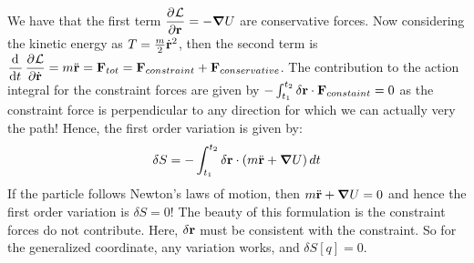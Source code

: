 We have that the first term $\dpd{\LL}{\v{r}} = -\grad{U}$ are conservative forces. Now considering the kinetic energy as $T = \frac{m}{2}\dot{\mathbf{r}}^2$, then the second term is $\dod{}{t}\dpd{\LL}{\dot{\v{r}}} = m\ddot{\v{r}} = \v{F}_{tot} = \v{F}_{constraint} + \v{F}_{conservative}$. The contribution to the action integral for the constraint forces are given by $-\int_{t_1}^{t_2}\delta\mathbf{r}\cdot\mathbf{F}_{constaint} = 0$ as the constraint force is perpendicular to any direction for which we can actually very the path! Hence, the first order variation is given by:
\[\delta S = -\int_{t_1}^{t_2}\delta\mathbf{r}\cdot\left(m\ddot{\mathbf{r}} + \grad{U}\right)dt\]
If the particle follows Newton's laws of motion, then $m\ddot{\mathbf{r}} + \grad{U} = 0$ and hence the first order variation is $\delta S = 0$! The beauty of this formulation is the constraint forces do not contribute. Here, $\delta\mathbf{r}$ must be consistent with the constraint. So for the generalized coordinate, any variation works, and $\delta S[q] = 0$.